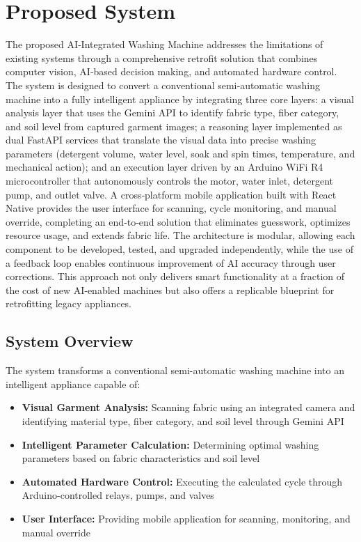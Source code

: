 \section{Proposed System}
The proposed AI‑Integrated Washing Machine addresses the limitations of existing systems through a comprehensive retrofit solution that combines computer vision, AI‑based decision making, and automated hardware control. The system is designed to convert a conventional semi‑automatic washing machine into a fully intelligent appliance by integrating three core layers: a visual analysis layer that uses the Gemini API to identify fabric type, fiber category, and soil level from captured garment images; a reasoning layer implemented as dual FastAPI services that translate the visual data into precise washing parameters (detergent volume, water level, soak and spin times, temperature, and mechanical action); and an execution layer driven by an Arduino WiFi R4 microcontroller that autonomously controls the motor, water inlet, detergent pump, and outlet valve. A cross‑platform mobile application built with React Native provides the user interface for scanning, cycle monitoring, and manual override, completing an end‑to‑end solution that eliminates guesswork, optimizes resource usage, and extends fabric life. The architecture is modular, allowing each component to be developed, tested, and upgraded independently, while the use of a feedback loop enables continuous improvement of AI accuracy through user corrections. This approach not only delivers smart functionality at a fraction of the cost of new AI‑enabled machines but also offers a replicable blueprint for retrofitting legacy appliances.
\subsection{System Overview}
The system transforms a conventional semi-automatic washing machine into an intelligent appliance capable of:
\begin{itemize}
    \item \textbf{Visual Garment Analysis:} Scanning fabric using an integrated camera and identifying material type, fiber category, and soil level through Gemini API
    \item \textbf{Intelligent Parameter Calculation:} Determining optimal washing parameters based on fabric characteristics and soil level
    \item \textbf{Automated Hardware Control:} Executing the calculated cycle through Arduino-controlled relays, pumps, and valves
    \item \textbf{User Interface:} Providing mobile application for scanning, monitoring, and manual override
\end{itemize}

